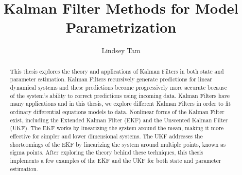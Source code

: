 \documentclass{pom_thesis}
\title{Kalman Filter Methods for Model Parametrization}
\author{Lindsey Tam }
\begin{document}
\maketitle

\begin{abstract}
	This thesis explores the theory and applications of Kalman Filters in both state and parameter estimation. Kalman Filters recursively generate predictions for linear dynamical systems and these predictions become progressively more accurate because of the system's ability to correct predictions using incoming data. Kalman Filters have many applications and in this thesis, we explore different Kalman Filters in order to fit ordinary differential equations models to data. Nonlinear forms of the Kalman Filter exist, including the Extended Kalman Filter (EKF) and the Unscented Kalman Filter (UKF). The EKF works by linearizing the system around the mean, making it more effective for simpler and lower dimensional systems. The UKF addresses the shortcomings of the EKF by linearizing the system around multiple points, known as sigma points. After exploring the theory behind these techniques, this thesis implements a few examples of the EKF and the UKF for both state and parameter estimation. \end{abstract}

\tableofcontents

























\appendix

\end{document}
